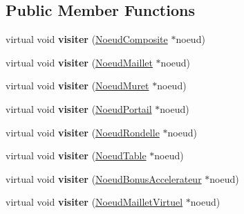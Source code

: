 \subsection*{Public Member Functions}
\begin{DoxyCompactItemize}
\item 
\hypertarget{class_visiteur_abstrait_a4353548a1b7ebd9c79eaa38130384877}{}\label{class_visiteur_abstrait_a4353548a1b7ebd9c79eaa38130384877} 
virtual void {\bfseries visiter} (\hyperlink{class_noeud_composite}{Noeud\+Composite} $\ast$noeud)
\item 
\hypertarget{class_visiteur_abstrait_a2a242fb5887554207429136ef4a9261e}{}\label{class_visiteur_abstrait_a2a242fb5887554207429136ef4a9261e} 
virtual void {\bfseries visiter} (\hyperlink{class_noeud_maillet}{Noeud\+Maillet} $\ast$noeud)
\item 
\hypertarget{class_visiteur_abstrait_ad877d5e1f30cc4517721a1207ebbd53e}{}\label{class_visiteur_abstrait_ad877d5e1f30cc4517721a1207ebbd53e} 
virtual void {\bfseries visiter} (\hyperlink{class_noeud_muret}{Noeud\+Muret} $\ast$noeud)
\item 
\hypertarget{class_visiteur_abstrait_ac3c91dd13a841bb8f3848da00f2c9f4a}{}\label{class_visiteur_abstrait_ac3c91dd13a841bb8f3848da00f2c9f4a} 
virtual void {\bfseries visiter} (\hyperlink{class_noeud_portail}{Noeud\+Portail} $\ast$noeud)
\item 
\hypertarget{class_visiteur_abstrait_acf24ab6866efb049b218a9fe167ead69}{}\label{class_visiteur_abstrait_acf24ab6866efb049b218a9fe167ead69} 
virtual void {\bfseries visiter} (\hyperlink{class_noeud_rondelle}{Noeud\+Rondelle} $\ast$noeud)
\item 
\hypertarget{class_visiteur_abstrait_a2029264db5794afe4ad89a8f441f60b3}{}\label{class_visiteur_abstrait_a2029264db5794afe4ad89a8f441f60b3} 
virtual void {\bfseries visiter} (\hyperlink{class_noeud_table}{Noeud\+Table} $\ast$noeud)
\item 
\hypertarget{class_visiteur_abstrait_a12e745b116e551d010e5564a39741e1c}{}\label{class_visiteur_abstrait_a12e745b116e551d010e5564a39741e1c} 
virtual void {\bfseries visiter} (\hyperlink{class_noeud_bonus_accelerateur}{Noeud\+Bonus\+Accelerateur} $\ast$noeud)
\item 
\hypertarget{class_visiteur_abstrait_a4a12dcd92f3bc5471c801706efc37aee}{}\label{class_visiteur_abstrait_a4a12dcd92f3bc5471c801706efc37aee} 
virtual void {\bfseries visiter} (\hyperlink{class_noeud_maillet_virtuel}{Noeud\+Maillet\+Virtuel} $\ast$noeud)
\end{DoxyCompactItemize}
